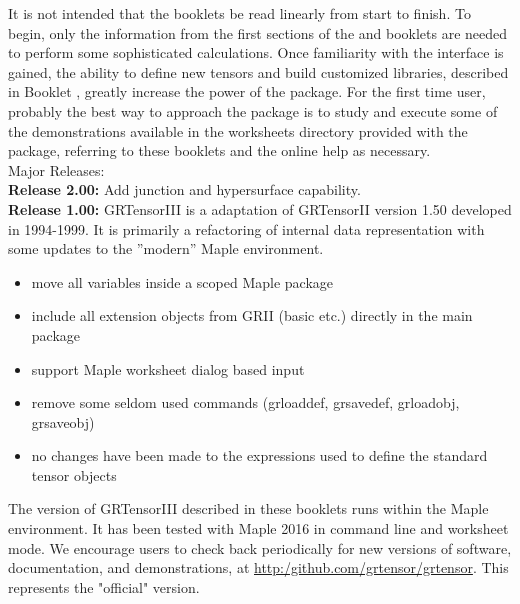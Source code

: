 \documentclass{article}
\begin{document}
It is not intended that the booklets be read linearly from start to
finish. To begin, only the information from the first sections of the
\textsl{\grMakegTitle} and \textsl{\grCalcTitle} booklets are needed
to perform some sophisticated calculations. Once familiarity with the
interface is gained, the ability to define new tensors and build
customized libraries, described in Booklet \grDefRef, greatly increase
the power of the package.  For the first time user, probably the best
way to approach the package is to study and execute some of the
demonstrations available in the worksheets directory provided with 
the package, referring to these booklets and the online help as
necessary.\\

Major Releases: \\

\textbf{Release 2.00:} Add junction and hypersurface capability. \\
 
\textbf{Release 1.00:} GRTensorIII is a adaptation of GRTensorII
version 1.50 developed in 1994-1999. It is primarily a refactoring
of internal data representation with some updates to the ''modern''
Maple environment. \\
\begin{itemize}
  \item move all variables inside a scoped Maple package
  \item include all extension objects from GRII (basic etc.) directly
  in the main package
  \item support Maple worksheet dialog based input
  \item remove some seldom used commands (grloaddef, grsavedef, 
  grloadobj, grsaveobj)
  \item no changes have been made to the expressions used to define
  the standard tensor objects\\
\end{itemize}

The version of GRTensorIII described in these booklets runs within the
Maple environment. It has been tested with Maple 2016 in command line and
worksheet mode. 
We encourage users to check back periodically for new
versions of software, documentation, and demonstrations, at \href{url}{http:/github.com/grtensor/grtensor}.
This represents the "official" version. \\

\getgrt \\
\end{document}
